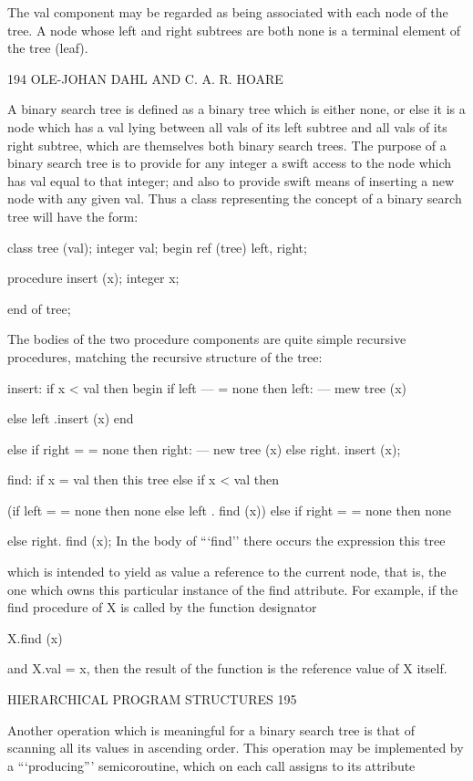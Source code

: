 {{{The val component may be regarded as being associated with each node of the tree. A node whose left and right subtrees are both none is a terminal element of the tree (leaf).

194 OLE-JOHAN DAHL AND C. A. R. HOARE

A binary search tree is defined as a binary tree which is either none, or else it is a node which has a val lying between all vals of its left subtree and all vals of its right subtree, which are themselves both binary search trees. The purpose of a binary search tree is to provide for any integer a swift access to the node which has val equal to that integer; and also to provide swift means of inserting a new node with any given val. Thus a class representing the concept of a binary search tree will have the form:

class tree (val); integer val; begin ref (tree) left, right;

procedure insert (x); integer x;

end of tree;

The bodies of the two procedure components are quite simple recursive procedures, matching the recursive structure of the tree:

insert: if x < val then begin if left — = none then left: — mew tree (x)

else left .insert (x) end

else if right = = none then right: — new tree (x) else right. insert (x);

find: if x = val then this tree else if x < val then

(if left = = none then none else left . find (x)) else if right = = none then none

else right. find (x); In the body of “‘find’’ there occurs the expression this tree

which is intended to yield as value a reference to the current node, that is, the one which owns this particular instance of the find attribute. For example, if the find procedure of X is called by the function designator

X.find (x)

and X.val = x, then the result of the function is the reference value of X itself.

HIERARCHICAL PROGRAM STRUCTURES 195

Another operation which is meaningful for a binary search tree is that of scanning all its values in ascending order. This operation may be implemented by a “‘producing”’ semicoroutine, which on each call assigns to its attribute

}}}
